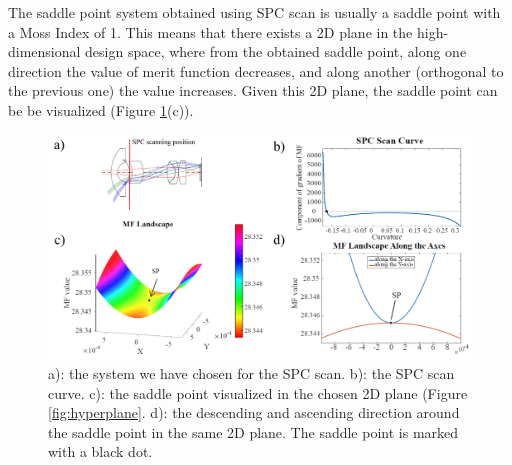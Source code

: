 The saddle point system obtained using SPC scan is usually a saddle point with a Moss Index of 1. This means that there exists a 2D plane in the high-dimensional design space, where from the obtained saddle point, along one direction the value of merit function decreases, and along another (orthogonal to the previous one) the value increases. Given this 2D plane, the saddle point can be be visualized (Figure \ref{fig:WAL_demo_sp}(c)). 
\begin{figure}[h!]
    \centering
    \includegraphics[width=\textwidth]{chapter-4/figures/WAL_demo_sp.png}
    \caption{a): the system we have chosen for the SPC scan. b): the SPC scan curve. c): the saddle point visualized in the chosen 2D plane (Figure \ref{fig:hyperplane}. d): the descending and ascending direction around the saddle point in the same 2D plane. The saddle point is marked with a black dot.}
    \label{fig:WAL_demo_sp}
\end{figure}

